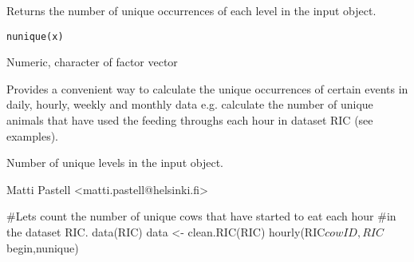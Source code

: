 \documentclass{book}
\begin{document}
\begin{Description}\relax
Returns the number of unique occurrences of each level in the input object.
\end{Description}
\begin{Usage}
\begin{verbatim}
nunique(x)
\end{verbatim}
\end{Usage}
\begin{Arguments}
\begin{ldescription}
\item[\code{x}] Numeric, character of factor vector
\end{ldescription}
\end{Arguments}
\begin{Details}\relax
Provides a convenient way to calculate the unique occurrences of certain
events in daily, hourly, weekly and monthly data e.g. calculate the
number of unique animals that have used the feeding throughs each hour
in dataset RIC (see examples).
\end{Details}
\begin{Value}
Number of unique levels in the input object.
\end{Value}
\begin{Author}\relax
Matti Pastell <matti.pastell@helsinki.fi>
\end{Author}
\begin{Examples}
\begin{ExampleCode}
#Lets count the number of unique cows that have started to eat each hour
#in the dataset RIC.
data(RIC)
data <- clean.RIC(RIC)
hourly(RIC$cowID,RIC$begin,nunique)

\end{ExampleCode}
\end{Examples}
\end{document}
